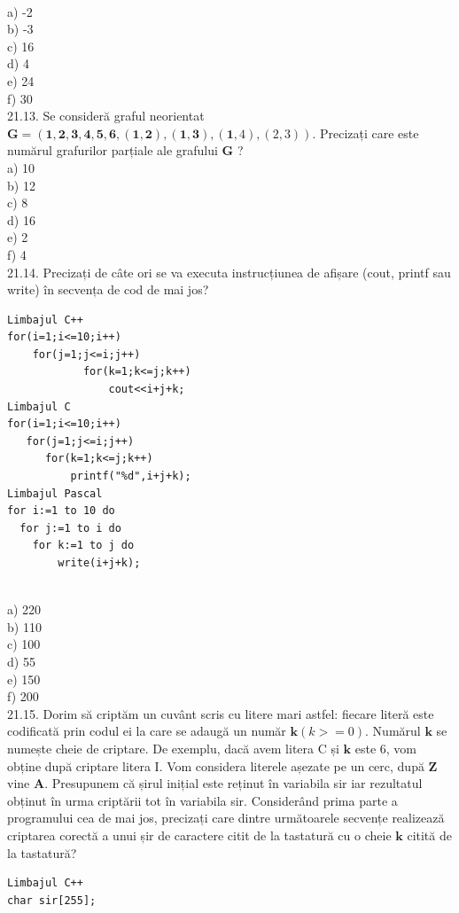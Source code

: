 {{\\
a) -2
\\
b) -3
\\
c) 16
\\
d) 4
\\
e) 24
\\
f) 30
\\
21.13. Se consideră graful neorientat $\mathbf{G}=({\mathbf{1 , 2 , 3 , 4 , 5 , 6 }},{(\mathbf{1 , 2}),(\mathbf{1}, \mathbf{3}),(\mathbf{1}, 4),(2,3)})$.
Precizați care este numărul grafurilor parțiale ale grafului $\mathbf{G}$ ?
\\
a) 10
\\
b) 12
\\
c) 8
\\
d) 16
\\
e) 2
\\
f) 4
\\
21.14. Precizați de câte ori se va executa instrucțiunea de afișare (cout, printf sau write) în secvența de cod de mai jos?
\begin{verbatim}
Limbajul C++
for(i=1;i<=10;i++)
    for(j=1;j<=i;j++)
            for(k=1;k<=j;k++)
                cout<<i+j+k;
Limbajul C 
for(i=1;i<=10;i++) 
   for(j=1;j<=i;j++) 
      for(k=1;k<=j;k++)    
          printf("%d",i+j+k);
Limbajul Pascal 
for i:=1 to 10 do 
  for j:=1 to i do 
    for k:=1 to j do 
        write(i+j+k);
\end{verbatim}
\\
a) 220
\\
b) 110
\\
c) 100
\\
d) 55
\\
e) 150
\\
f) 200
\\
21.15. Dorim să criptăm un cuvânt scris cu litere mari astfel: fiecare literă este codificată prin codul ei la care se adaugă un număr $\mathbf{k}(k>=0)$. Numărul $\mathbf{k}$ se numește cheie de criptare. De exemplu, dacă avem litera C și $\mathbf{k}$ este 6, vom obține după criptare litera I. Vom considera literele așezate pe un cerc, după $\mathbf{Z}$ vine $\mathbf{A}$. Presupunem că șirul inițial este reținut în variabila sir iar rezultatul obținut în urma criptării tot în variabila sir.
Considerând prima parte a programului cea de mai jos, precizați care dintre următoarele secvențe realizează criptarea corectă a unui șir de caractere citit de la tastatură cu o cheie $\mathbf{k}$ citită de la tastatură?
\begin{verbatim}
Limbajul C++
char sir[255];

\end{verbatim}}}
